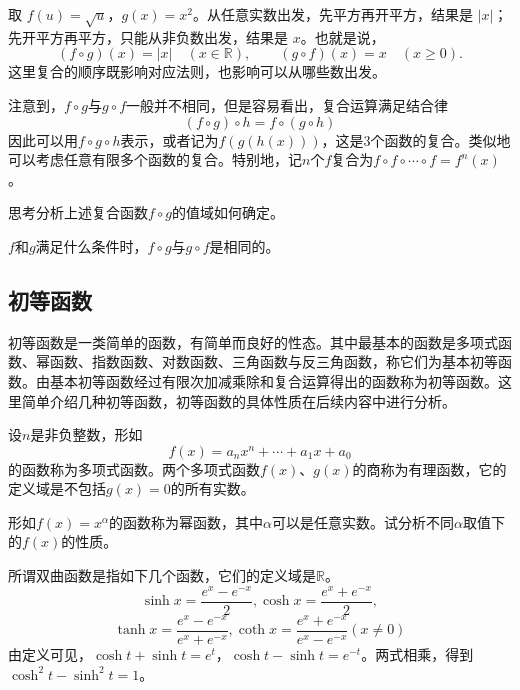 取 \(f(u)=\sqrt u\)，\(g(x)=x^2\)。从任意实数出发，先平方再开平方，结果是 \(|x|\)；先开平方再平方，只能从非负数出发，结果是 \(x\)。也就是说，
\[
 (f\circ g)(x)=|x| \quad (x\in\mathbb R),\qquad
 (g\circ f)(x)=x \quad (x\geq 0).
\]
这里复合的顺序既影响对应法则，也影响可以从哪些数出发。

注意到，\(f \circ g\)与\(g \circ f\)一般并不相同，但是容易看出，复合运算满足结合律
\begin{equation}
\left( f \circ g \right) \circ h = f \circ \left( g \circ h \right)
\end{equation}
因此可以用\(f \circ g \circ h\)表示，或者记为\(f(g(h(x)))\)，这是3个函数的复合。类似地可以考虑任意有限多个函数的复合。特别地，记\(n\)个\(f\)复合为\(f \circ f \circ \cdots \circ f = f^{n}(x)\)。

{\kaiti{}思考\quad 分析上述复合函数\(f \circ g\)的值域如何确定。}

{\kaiti{}\hspace*{\parindent}\(f\)和\(g\)满足什么条件时，\(f \circ g\)与\(g \circ f\)是相同的。}


\subsection{初等函数}
初等函数是一类简单的函数，有简单而良好的性态。其中最基本的函数是多项式函数、幂函数、指数函数、对数函数、三角函数与反三角函数，称它们为{\heiti{}基本初等函数}。由基本初等函数经过有限次加减乘除和复合运算得出的函数称为{\heiti{}初等函数}。这里简单介绍几种初等函数，初等函数的具体性质在后续内容中进行分析。

设\(n\)是非负整数，形如
\begin{equation}
f(x) = a_{n} x^{n} + \cdots + a_{1} x + a_{0}
\end{equation}
的函数称为多项式函数。两个多项式函数\(f(x)\)、\(g(x)\)的商称为有理函数，它的定义域是不包括\(g(x) = 0\)的所有实数。

形如\(f(x) = x^{\alpha}\)的函数称为幂函数，其中\(\alpha\)可以是任意实数。试分析不同\(\alpha\)取值下的\(f(x)\)的性质。

所谓双曲函数是指如下几个函数，它们的定义域是\(\mathbb{R}\)。
\begin{equation}
\sinh x = \frac{e^{x} - e^{- x}}{2} , \cosh x = \frac{e^{x} + e^{- x}}{2} ,
\end{equation}
\begin{equation}
\tanh x = \frac{e^{x} - e^{- x}}{e^{x} + e^{- x}} , \coth x = \frac{e^{x} + e^{- x}}{e^{x} - e^{- x}} ( x \ne 0 )
\end{equation}
由定义可见，\(\cosh t+\sinh t=e^t\)，\(\cosh t-\sinh t=e^{-t}\)。两式相乘，得到 \(\cosh^2 t-\sinh^2 t=1\)。

